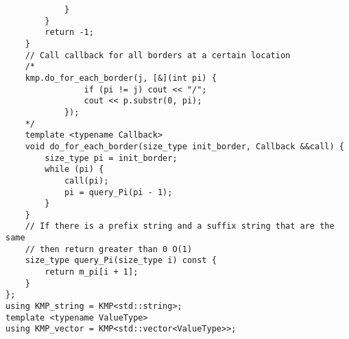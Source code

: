 \begin{lstlisting}
            }
        }
        return -1;
    }
    // Call callback for all borders at a certain location
    /*
    kmp.do_for_each_border(j, [&](int pi) {
                if (pi != j) cout << "/";
                cout << p.substr(0, pi);
            });
    */
    template <typename Callback>
    void do_for_each_border(size_type init_border, Callback &&call) {
        size_type pi = init_border;
        while (pi) {
            call(pi);
            pi = query_Pi(pi - 1);
        }
    }
    // If there is a prefix string and a suffix string that are the same
    // then return greater than 0 O(1)
    size_type query_Pi(size_type i) const { 
        return m_pi[i + 1];
    }
};
using KMP_string = KMP<std::string>;
template <typename ValueType>
using KMP_vector = KMP<std::vector<ValueType>>;
\end{lstlisting}
